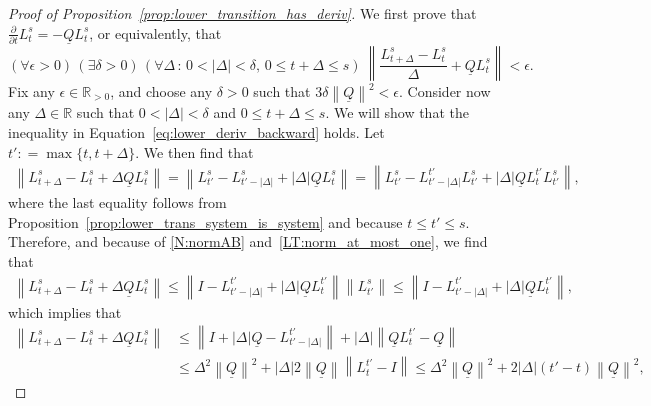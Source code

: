 \documentclass[10pt,a4paper]{paper}
\theoremstyle{definition}
\newcommand{\reals}{\mathbb{R}}
\newcommand{\realspos}{\reals_{>0}}
\newcommand{\lrate}{\underline{Q}}
\newcommand{\norm}[1]{\left\lVert #1 \right\rVert}
\newcommand{\abs}[1]{\left\vert #1 \right\vert}
\newcommand{\coloneqq}{:\!=}
\begin{document}
\begin{proof}[Proof of Proposition~\ref{prop:lower_transition_has_deriv}]
We first prove that $\frac{\partial}{\partial t}L_t^s=-\lrate L_t^s$, or equivalently, that
\begin{equation}\label{eq:lower_deriv_backward}
(\forall\epsilon>0)\,
(\exists\delta>0)\,
(\forall\Delta\,:\,0<\lvert\Delta\rvert <\delta,\,0\leq t+\Delta\leq s)~
\norm{\frac{L_{t+\Delta}^s-L_t^s}{\Delta}+\lrate L_t^s}<\epsilon.
\end{equation}
Fix any $\epsilon\in\realspos$, and choose any $\delta>0$ such that $3\delta\norm{\lrate}^2<\epsilon$. Consider now any $\Delta\in\reals$ such that $0<\abs{\Delta}<\delta$ and $0\leq t+\Delta\leq s$.
We will show that the inequality in Equation~\eqref{eq:lower_deriv_backward} holds.
Let $t'\coloneqq\max\{t,t+\Delta\}$. We then find that
\begin{align*}
\norm{L_{t+\Delta}^s-L_t^s+\Delta\lrate L_t^s}
=\norm{L_{t'}^s-L_{t'-\abs{\Delta}}^s+\abs{\Delta}\lrate L_{t}^s}
=\norm{L_{t'}^s-L_{t'-\abs{\Delta}}^{t'}L_{t'}^s+\abs{\Delta}\lrate L_{t}^{t'}L_{t'}^s},
\end{align*}
where the last equality follows from Proposition~\ref{prop:lower_trans_system_is_system} and because $t\leq t'\leq s$. Therefore, and because of \ref{N:normAB} and~\ref{LT:norm_at_most_one}, we find that
\begin{align*}
\norm{L_{t+\Delta}^s-L_t^s+\Delta\lrate L_t^s}
\leq\norm{I-L_{t'-\abs{\Delta}}^{t'}+\abs{\Delta}\lrate L_{t}^{t'}}\norm{L_{t'}^s}
\leq\norm{I-L_{t'-\abs{\Delta}}^{t'}+\abs{\Delta}\lrate L_{t}^{t'}},
\end{align*}
which implies that
\begin{align*}
\norm{L_{t+\Delta}^s-L_t^s+\Delta\lrate L_t^s}
&\leq\norm{I+\abs{\Delta}\lrate-L_{t'-\abs{\Delta}}^{t'}}
+
\abs{\Delta}\norm{\lrate L_{t}^{t'}-\lrate}\\
&\leq
\Delta^2\norm{\lrate}^2+\abs{\Delta}2\norm{\lrate}\norm{L_{t}^{t'}-I}\leq\Delta^2\norm{\lrate}^2+2\abs{\Delta}(t'-t)\norm{\lrate}^2,

\end{align*}
\end{proof}
\end{document}
